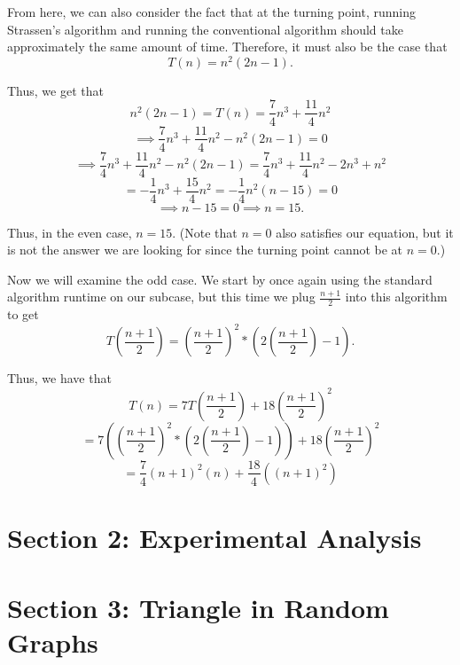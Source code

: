 \documentclass{article}
\begin{document}
From here, we can also consider the fact that at the turning point, running Strassen's algorithm and running the conventional algorithm should take approximately the same amount of time. Therefore, it must also be the case that $$T(n)=n^2(2n-1).$$

Thus, we get that $$n^2(2n-1) = T(n) = \frac{7}{4}n^3 + \frac{11}{4}n^2$$ $$\implies \frac{7}{4}n^3 + \frac{11}{4}n^2 - n^2(2n-1) = 0$$ $$\implies \frac{7}{4}n^3 + \frac{11}{4}n^2 - n^2(2n-1) = \frac{7}{4}n^3 + \frac{11}{4}n^2 - 2n^3 + n^2$$ $$=-\frac{1}{4}n^3+\frac{15}{4}n^2=-\frac{1}{4}n^2(n-15) = 0$$ $$\implies n-15=0 \implies n = 15.$$

Thus, in the even case, $n=15$. (Note that $n=0$ also satisfies our equation, but it is not the answer we are looking for since the turning point cannot be at $n=0$.)

\medskip

Now we will examine the odd case. We start by once again using the standard algorithm runtime on our subcase, but this time we plug $\frac{n+1}{2}$ into this algorithm to get $$T\left(\frac{n+1}{2}\right) = \left(\frac{n+1}{2}\right)^2*\left(2\left(\frac{n+1}{2}\right)-1\right).$$

Thus, we have that $$T(n)=7T\left(\frac{n+1}{2}\right) + 18\left(\frac{n+1}{2}\right)^2$$ $$= 7\left(\left(\frac{n+1}{2}\right)^2*\left(2\left(\frac{n+1}{2}\right)-1\right)\right) + 18\left(\frac{n+1}{2}\right)^2$$ $$=\frac{7}{4}(n+1)^2(n) + \frac{18}{4}((n+1)^2)$$

\section{Section 2: Experimental Analysis}


\section{Section 3: Triangle in Random Graphs}
\end{document}
